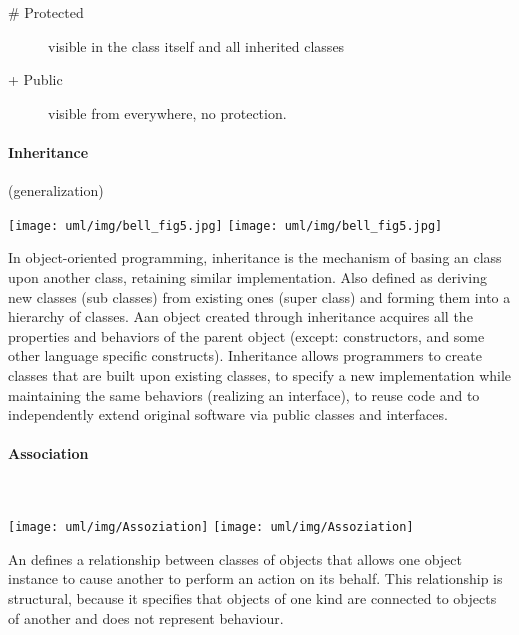 \begin{minipage}[c]{0.45\linewidth}
\begin{minipage}[c]{0.58\linewidth}
\begin{description}
\item [\# Protected] visible in the class itself and all inherited classes

\item [+ Public] visible from everywhere, no protection.
\end{description}
\end{minipage}

\newpage
\paragraph{Inheritance} (generalization)\\[2ex]
\begin{minipage}[c]{0.5\linewidth}
\ifslides
\texttt{[image: uml/img/bell\_fig5.jpg]}
\else
\texttt{[image: uml/img/bell\_fig5.jpg]}
\fi
\end{minipage}
\begin{minipage}[c]{0.45\linewidth}

In object-oriented programming, inheritance is the mechanism of basing an
class upon another class, retaining similar implementation. Also defined as
deriving new classes (sub classes) from existing ones (super class)
and forming them into a hierarchy of classes. Aan object created through
inheritance acquires all the properties and behaviors of the parent
object (except: constructors, and some other language specific constructs).
Inheritance allows programmers to create classes
that are built upon existing classes, to specify a new implementation while
maintaining the same behaviors (realizing an interface), to reuse code and to
independently extend original software via public classes and interfaces.
\end{minipage}
%
\newpage
\paragraph{Association}\mbox{} \\
\begin{minipage}[c]{0.28\linewidth}
\ifslides
\texttt{[image: uml/img/Assoziation]}
\else
\texttt{[image: uml/img/Assoziation]}
\fi
\end{minipage}
\begin{minipage}[c]{0.7\linewidth}
An  defines a relationship between classes of
objects that allows one object instance to cause another to perform an action
on its behalf. This relationship is structural, because it specifies that
objects of one kind are connected to objects of another and does not
represent behaviour.
\end{minipage}
%
\ifslides
\newpage
\fi

\end{minipage}
